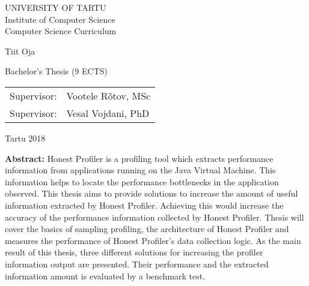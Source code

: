 \documentclass{style/thesis}
\begin{document}
\thispagestyle{empty}
\begin{center}

\large
UNIVERSITY OF TARTU\\[2mm]
Institute of Computer Science\\
Computer Science Curriculum\\[2mm]

\vspace{25mm}

\Large Tiit Oja

\vspace{4mm}

\huge \articleName

\vspace{20mm}

\Large Bachelor's Thesis (9 ECTS)

\end{center}

\vspace{2mm}

\begin{flushright}
 {
 \setlength{\extrarowheight}{5pt}
 \begin{tabular}{r l} 
  \sffamily Supervisor: & \sffamily Vootele Rõtov, MSc \\
  \sffamily Supervisor: & \sffamily Vesal Vojdani, PhD
 \end{tabular}
 }
\end{flushright}

\vfill
\centerline{Tartu 2018}



\pagebreak

\noindent\textbf{\large \articleName}
\vspace*{0mm}

\textbf{Abstract:} Honest Profiler is a profiling tool which extracts performance information from applications running on the Java Virtual Machine. This information helps to locate the performance bottlenecks in the application observed. This thesis aims to provide solutions to increase the amount of useful information extracted by Honest Profiler. Achieving this would increase the accuracy of the performance information collected by Honest Profiler. Thesis will cover the basics of sampling profiling, the architecture of Honest Profiler and measures the performance of Honest Profiler's data collection logic. As the main result of this thesis, three different solutions for increasing the profiler information output are presented. Their performance and the extracted information amount is evaluated by a benchmark test.
  
\end{document}
